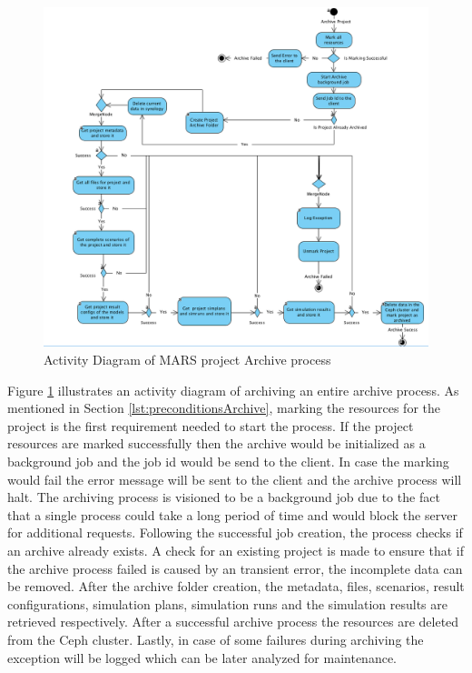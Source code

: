 \begin{figure}[H]
    \centering \includegraphics[scale=0.45]{grafiken/archiveActivity.png}
    \caption{Activity Diagram of MARS project Archive process}
    \label{fig:archiveActivity}
\end{figure}

Figure \ref{fig:archiveActivity} illustrates an activity diagram of archiving an entire archive process. As mentioned in Section \ref{lst:preconditionsArchive},
marking the resources for the project is the first requirement needed to start the process. If the project resources are marked successfully
then the archive would be initialized as a background job and the job id would be send to the client. In case the marking would fail the error message will be 
sent to the client and the archive process will halt. The archiving process is visioned to be a background job due to the fact that a single process could take
a long period of time and would block the server for additional requests. Following the successful job creation, the process checks if an archive already
exists. A check for an existing project is made to ensure that if the archive process failed is caused by an transient error, the incomplete data can be removed. After
the archive folder creation, the metadata, files, scenarios, result configurations, simulation plans, simulation runs and the simulation results are retrieved respectively.
After a successful archive process the  resources are deleted from the Ceph cluster. Lastly, in case of some failures during archiving the exception will be logged 
which can be later analyzed for maintenance.

